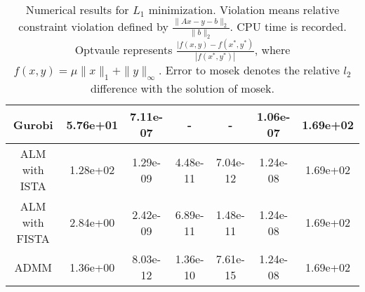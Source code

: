 \documentclass{article}
\begin{document}
\begin{table}[H]
\begin{tabular}{|c|c|c|c|c|c|c|}
Gurobi & 5.76e+01 & 7.11e-07 & - & - & 1.06e-07 & 1.69e+02\\\hline
ALM with ISTA & 1.28e+02 & 1.29e-09 & 4.48e-11 & 7.04e-12 &1.24e-08 & 1.69e+02 \\\hline
ALM with FISTA & 2.84e+00 & 2.42e-09 & 6.89e-11 & 1.48e-11 &1.24e-08 & 1.69e+02 \\\hline
ADMM & 1.36e+00 & 8.03e-12 & 1.36e-10 & 7.61e-15&1.24e-08 & 1.69e+02  \\\hline
\end{tabular}
\caption{Numerical results for $L_1$ minimization. Violation means relative constraint violation defined by $\frac{\|Ax-y-b\|_2}{\|b\|_2}$. CPU time is recorded. Optvaule represents $\frac{|f(x,y)-f(x^*,y^*)}{|f(x^*,y^*)|}$, where $f(x,y)=\mu\|x\|_1+\|y\|_\infty$. Error to mosek denotes the relative $l_2$ difference with the solution of mosek.\label{table1}}
\end{table}
  

\end{document}
